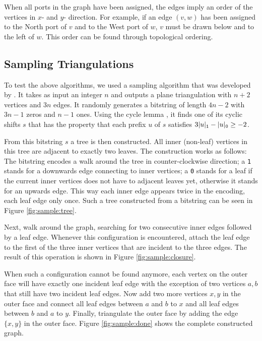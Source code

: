 \documentclass[a4paper]{article}
\begin{document}
When all ports in the graph have been assigned, the edges imply an order of the
vertices in $x$- and $y$- direction.
For example, if an edge $(v,w)$ has been assigned to the North port of $v$ and
to the West port of $w$, $v$ must be drawn below and to the left of $w$.
This order can be found through topological ordering.

\subsection{Sampling Triangulations}\label{sec:algo:sampling}
To test the above algorithms, we used a sampling algorithm that was developed by
\citet{sampling}.
It takes as input an integer $n$ and outputs a plane triangulation with $n+2$
vertices and $3n$ edges.
It randomly generates a bitstring of length $4n-2$ with $3n-1$ zeros and $n-1$
ones.
Using the cycle lemma \cite{cyclelemma}, it finds one of its cyclic shifts $s$
that has the property that each prefix $u$ of $s$ satisfies $3|u|_{\tt 1} -
|u|_{\tt 0} \geq -2$.

From this bitstring $s$ a tree is then constructed.
All inner (non-leaf) vertices in this tree are adjacent to exactly two leaves.
The construction works as follows:
The bitstring encodes a walk around the tree in counter-clockwise direction; a
{\tt 1} stands for a downwards edge connecting to inner vertices; a {\tt 0}
stands for a leaf if the current inner vertices does not have to adjacent leaves
yet, otherwise it stands for an upwards edge.
This way each inner edge appears twice in the encoding, each leaf edge only
once.
Such a tree constructed from a bitstring can be seen in Figure
\ref{fig:sample:tree}.

Next, walk around the graph, searching for two consecutive inner edges
followed by a leaf edge.
Whenever this configuration is encountered, attach the leaf edge to the first of
the three inner vertices that are incident to the three edges.
The result of this operation is shown in Figure \ref{fig:sample:closure}.

When such a configuration cannot be found anymore, each vertex on the outer face
will have exactly one incident leaf edge with the exception of two vertices
$a,b$ that still have two incident leaf edges.
Now add two more vertices $x,y$ in the outer face and connect all leaf edges
between $a$ and $b$ to $x$ and all leaf edges between $b$ and $a$ to $y$.
Finally, triangulate the outer face by adding the edge $\{x,y\}$ in the outer
face.
Figure \ref{fig:sample:done} shows the complete constructed graph.
\end{document}
